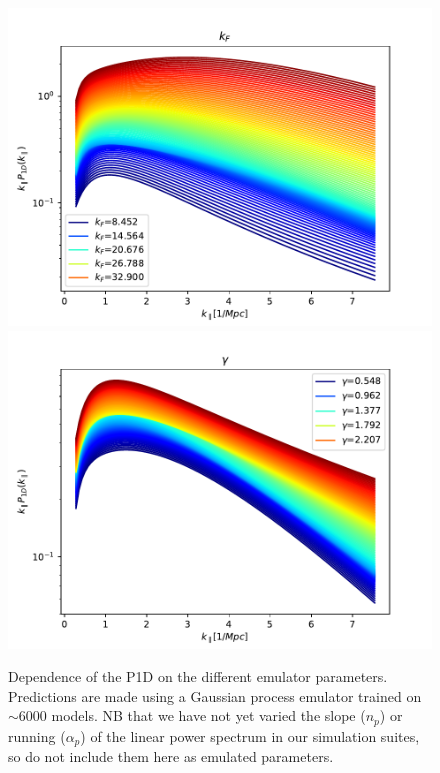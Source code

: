 \documentclass[]{article}
\begin{document}
\begin{figure}[h]
    \includegraphics[scale=0.47]{Figures/256_kF_Mpc.pdf}
    \includegraphics[scale=0.47]{Figures/256_gamma.pdf}
    \caption{Dependence of the P1D on the different emulator parameters. Predictions are 
    made using a Gaussian process emulator trained on $\sim6000$ models. NB that we have not 
    yet varied the slope ($n_p$) or running ($\alpha_p$) of the linear power spectrum in 
    our simulation suites, so do not include them here as emulated parameters.}
\end{figure}

\clearpage
\end{document}
